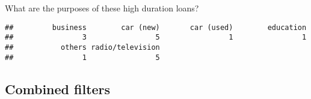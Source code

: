 \documentclass[
]{article}
\newenvironment{Shaded}{\begin{snugshade}}{\end{snugshade}}
\newcommand{\DecValTok}[1]{\textcolor[rgb]{0.00,0.00,0.81}{#1}}
\newcommand{\FunctionTok}[1]{\textcolor[rgb]{0.00,0.00,0.00}{#1}}
\newcommand{\NormalTok}[1]{#1}
\newcommand{\OtherTok}[1]{\textcolor[rgb]{0.56,0.35,0.01}{#1}}
\newcommand{\SpecialCharTok}[1]{\textcolor[rgb]{0.00,0.00,0.00}{#1}}
\newcommand{\StringTok}[1]{\textcolor[rgb]{0.31,0.60,0.02}{#1}}
\begin{document}
What are the purposes of these high duration loans?

\begin{Shaded}
\end{Shaded}

\begin{verbatim}
##         business        car (new)       car (used)        education 
##                3                5                1                1 
##           others radio/television 
##                1                5
\end{verbatim}

\hypertarget{combined-filters}{%
\subsection{Combined filters}\label{combined-filters}}

\begin{Shaded}
\end{Shaded}
\end{document}
